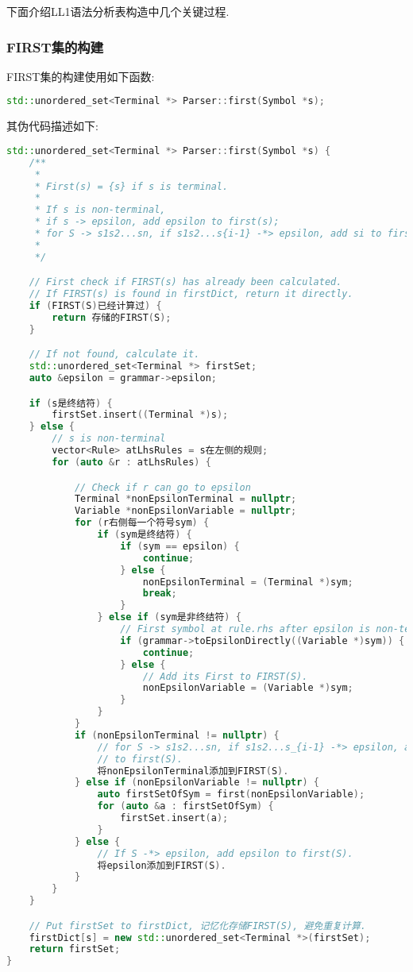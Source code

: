 下面介绍LL1语法分析表构造中几个关键过程.
\subsubsection{FIRST集的构建}
FIRST集的构建使用如下函数:
\begin{lstlisting}[language=c++]
std::unordered_set<Terminal *> Parser::first(Symbol *s);
\end{lstlisting}

其伪代码描述如下:
\begin{lstlisting}[language=c++]
std::unordered_set<Terminal *> Parser::first(Symbol *s) {
    /**
     *
     * First(s) = {s} if s is terminal.
     *
     * If s is non-terminal,
     * if s -> epsilon, add epsilon to first(s);
     * for S -> s1s2...sn, if s1s2...s{i-1} -*> epsilon, add si to first(S).
     *
     */

    // First check if FIRST(s) has already been calculated.
    // If FIRST(s) is found in firstDict, return it directly.
    if (FIRST(S)已经计算过) {
        return 存储的FIRST(S);
    }

    // If not found, calculate it.
    std::unordered_set<Terminal *> firstSet;
    auto &epsilon = grammar->epsilon;

    if (s是终结符) {
        firstSet.insert((Terminal *)s);
    } else {
        // s is non-terminal
        vector<Rule> atLhsRules = s在左侧的规则;
        for (auto &r : atLhsRules) {

            // Check if r can go to epsilon
            Terminal *nonEpsilonTerminal = nullptr;
            Variable *nonEpsilonVariable = nullptr;
            for (r右侧每一个符号sym) {
                if (sym是终结符) {
                    if (sym == epsilon) {
                        continue;
                    } else {
                        nonEpsilonTerminal = (Terminal *)sym;
                        break;
                    }
                } else if (sym是非终结符) {
                    // First symbol at rule.rhs after epsilon is non-terminal.
                    if (grammar->toEpsilonDirectly((Variable *)sym)) {
                        continue;
                    } else {
                        // Add its First to FIRST(S).
                        nonEpsilonVariable = (Variable *)sym;
                    }
                }
            }
            if (nonEpsilonTerminal != nullptr) {
                // for S -> s1s2...sn, if s1s2...s_{i-1} -*> epsilon, add si
                // to first(S).
                将nonEpsilonTerminal添加到FIRST(S).
            } else if (nonEpsilonVariable != nullptr) {
                auto firstSetOfSym = first(nonEpsilonVariable);
                for (auto &a : firstSetOfSym) {
                    firstSet.insert(a);
                }
            } else {
                // If S -*> epsilon, add epsilon to first(S).
                将epsilon添加到FIRST(S).
            }
        }
    }

    // Put firstSet to firstDict, 记忆化存储FIRST(S), 避免重复计算.
    firstDict[s] = new std::unordered_set<Terminal *>(firstSet);
    return firstSet;
}
\end{lstlisting}
